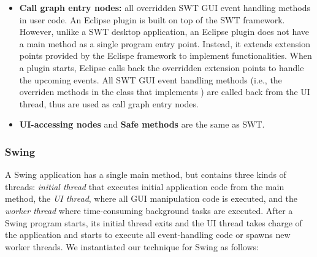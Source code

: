 \begin{itemize}

\item \textbf{Call graph entry nodes: } all overridden SWT
GUI event handling methods in user code. An Eclipse plugin is built
on top of the SWT framework. However, unlike a SWT desktop application,
an Eclipse plugin does not have a main method as a single program entry point.
Instead, it extends extension points provided by the Eclispe framework to
implement functionalities. When a plugin starts, Eclipse
calls back the overridden extension points to handle the
upcoming events. All SWT GUI event handling methods (i.e., the overriden
methods in the class that implements ) are
called back from the UI thread, thus are used as call graph entry nodes.


\item \textbf{UI-accessing nodes} and \textbf{Safe methods} are the same as SWT.

\end{itemize}

\subsubsection{Swing}


A Swing application has a single main method, but contains three kinds of
threads: \textit{initial thread} that executes initial application code from the main method,
the \textit{UI thread}, where all GUI manipulation code is executed,
and the \textit{worker thread} where time-consuming background tasks are executed.
After a Swing program starts, its initial thread exits and the UI thread takes charge
of the application and starts to execute all event-handling code or spawns new worker threads. 
We instantiated our technique for Swing as follows:

